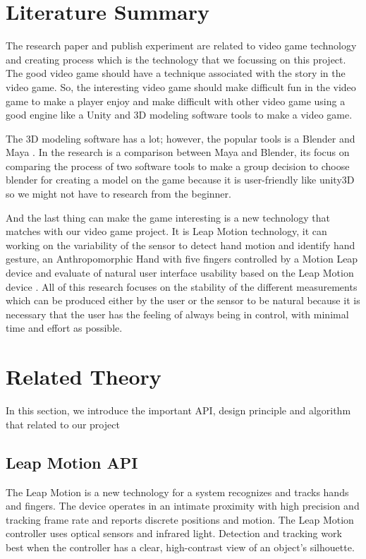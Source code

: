 \documentclass[journal]{IEEEtran}										    %
\begin{document}
    \section{Literature Summary}                                            %
        The research paper and publish experiment are related to video game 
        technology and creating process which is the technology that we 
        focussing on this project. The good video game should have a technique 
        associated with the story in the video game. So, the interesting 
        video game should make difficult fun in the video game to make a player 
        enjoy and make difficult with other video game \cite{TAG5} using a good engine 
        like a Unity and 3D modeling software tools to make a video game.

        The 3D modeling software has a lot; however, the popular tools is a 
        Blender and Maya \cite{TAG4}. In the research is a comparison between Maya 
        and Blender, its focus on comparing the process of two software tools 
        to make a group decision to choose blender for creating a model on 
        the game because it is user-friendly like unity3D so we might not 
        have to research from the beginner.

        And the last thing can make the game interesting is a new technology 
        that matches with our video game project. It is Leap Motion technology, 
        it can working on the variability of the sensor \cite{TAG1} to detect hand motion 
        and identify hand gesture, an Anthropomorphic Hand with five fingers 
        controlled by a Motion Leap device \cite{TAG2} and evaluate of natural user 
        interface usability based on the Leap Motion device \cite{TAG3}. All of this 
        research focuses on the stability of the different measurements which 
        can be produced either by the user or the sensor to be natural because 
        it is necessary that the user has the feeling of always being in control, 
        with minimal time and effort as possible.


        \section{Related Theory}
        In this section, we introduce the important API, design principle and algorithm
        that related to our project

            \subsection{Leap Motion API}
                The Leap Motion is a new technology for a system recognizes 
                and tracks hands and fingers. The device operates in an intimate 
                proximity with high precision and tracking frame rate and reports 
                discrete positions and motion. The Leap Motion controller uses 
                optical sensors and infrared light. Detection and tracking work 
                best when the controller has a clear, high-contrast view of an 
                object’s silhouette.
\end{document}
